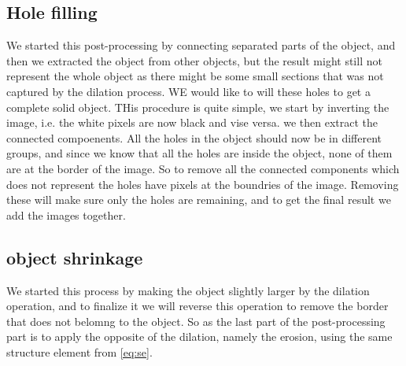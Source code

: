 
\subsection{Hole filling}

We started this post-processing by connecting separated parts of the object, and then we extracted the object from other objects, but the result might still not represent the whole object as there might be some small sections that was not captured by the dilation process. WE would like to will these holes to get a complete solid object. THis procedure is quite simple, we start by inverting the image, i.e. the white pixels are now black and vise versa. we then extract the connected compoenents. All the holes in the object should now be in different groups, and since we know that all the holes are inside the object, none of them are at the border of the image. So to remove all the connected components which does not represent the holes have pixels at the boundries of the image. Removing these will make sure only the holes are remaining, and to get the final result we add the images together.


\subsection{object shrinkage}

We started this process by making the object slightly larger by the dilation operation, and to finalize it we will reverse this operation to remove the border that does not belomng to the object. So as the last part of the post-processing part is to apply the opposite of the dilation, namely the erosion, using the same structure element from \eqref{eq:se}.
